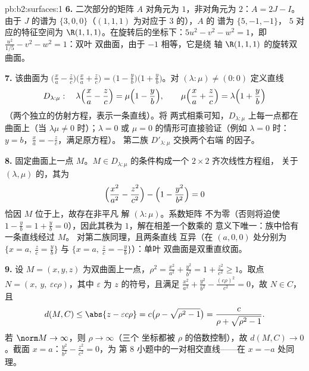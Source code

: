 \begin{solution}{pb:b2:surfaces:1}
\textbf{6.} 二次部分的矩阵 $A$ 对角元为
$1$，非对角元为 $2$：$A = 2J - I$。由于 $J$ 的谱为
$\{3, 0, 0\}$（$(1,1,1)$ 为对应于 $3$ 的），$A$ 的
谱为 $\{5, -1, -1\}$， $5$ 对应的特征空间为
$\R(1,1,1)$。在旋转后的坐标下：$5u^2 - v^2 - w^2 =
1$，即 $\frac{u^2}{1/5} - v^2 - w^2 = 1$：双叶
双曲面，由于 $-1$ 相等，它是绕
轴 $\R(1,1,1)$ 的旋转双曲面。

\textbf{7.} 该曲面为 $\bigl(\frac xa - \frac
zc\bigr)\bigl(\frac xa + \frac zc\bigr) = \bigl(1 - \frac
yb\bigr)\bigl(1 + \frac yb\bigr)$。对 $(\lambda : \mu) \neq
(0:0)$ 定义直线
\[
D_{\lambda:\mu} :\quad
\lambda\Bigl(\frac xa - \frac zc\Bigr) = \mu\Bigl(1 - \frac
yb\Bigr), \qquad
\mu\Bigl(\frac xa + \frac zc\Bigr) = \lambda\Bigl(1 + \frac
yb\Bigr)
\]
（两个独立的仿射方程，表示一条直线）。将
两式相乘可知，$D_{\lambda:\mu}$ 上每一点都在
曲面上（当 $\lambda\mu \neq 0$ 时）；$\lambda = 0$
或 $\mu = 0$ 的情形可直接验证（例如 $\lambda = 0$ 时：$y =
b$，$\frac xa = -\frac zc$，满足原方程）。
第二族 $D'_{\lambda:\mu}$ 交换两个右端
的因子。

\textbf{8.} 固定曲面上一点 $M$。$M \in
D_{\lambda:\mu}$ 的条件构成一个 $2\times2$ 齐次线性方程组，
关于 $(\lambda, \mu)$ 的，其为
\[
\Bigl(\frac{x^2}{a^2} - \frac{z^2}{c^2}\Bigr) - \Bigl(1 -
\frac{y^2}{b^2}\Bigr) = 0
\]
恰因 $M$ 位于上，故存在非平凡
解 $(\lambda : \mu)$。系数矩阵
不为零（否则将迫使 $1 - \frac yb = 1 + \frac yb =
0$），因此其秩为 $1$，解在相差一个数乘的
意义下唯一：族中恰有一条直线经过 $M$。
对第二族同理，且两条直线
互异（在 $(a, 0, 0)$ 处分别为 $\{x = a,\ \frac zc = \frac
yb\}$ 与 $\{x = a,\ \frac zc = -\frac yb\}$）：单叶
双曲面是双重直纹面。

\textbf{9.} 设 $M = (x, y, z)$ 为双曲面上一点，$\rho^2 =
\frac{x^2}{a^2} + \frac{y^2}{b^2} = 1 + \frac{z^2}{c^2} \geq
1$。取点 $N = (x,\ y,\ \varepsilon c\rho)$，其中
$\varepsilon$ 为 $z$ 的符号，且满足 $\frac{x^2}{a^2} +
\frac{y^2}{b^2} - \frac{(c\rho)^2}{c^2} = 0$，故 $N \in C$，且
\[
d(M, C) \leq \abs{z - \varepsilon c\rho}
= c\bigl(\rho - \sqrt{\rho^2 - 1}\bigr)
= \frac{c}{\rho + \sqrt{\rho^2 - 1}} .
\]
若 $\norm M \to \infty$，则 $\rho \to \infty$（三个
坐标都被 $\rho$ 的倍数控制），故 $d(M, C)
\to 0$。截面 $x = a$：$\frac{y^2}{b^2} -
\frac{z^2}{c^2} = 0$，为
第 8 小题中的一对相交直线——在 $x = -a$ 处同理。


\end{solution}
